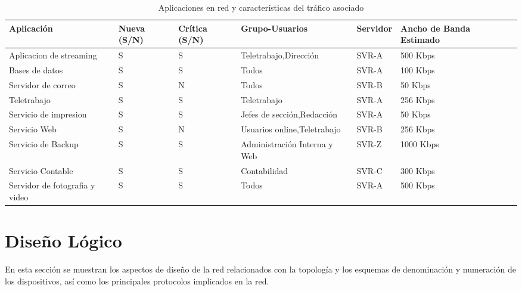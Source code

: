 \documentclass[a4paper,onecolumn,11pt]{article}
\begin{document}
\begin{table}[htbp]
\small \sffamily
\caption{Aplicaciones en red y características del tráfico asociado}
\begin{center}
\begin{tabular}{p{}p{}p{}p{}p{}p{}p{}}
\toprule
\textbf{Aplicación} & \textbf{Nueva (S/N)} & \textbf{Crítica (S/N)} & \textbf{Grupo-Usuarios} & \textbf{Servidor} & \textbf{Ancho de Banda Estimado}\\
\toprule

Aplicacion de streaming & S & S & Teletrabajo,Dirección & SVR-A  & 500 Kbps \\ \midrule
Bases de datos & S & S & Todos & SVR-A  & 100 Kbps \\ \midrule
Servidor de correo & S & N & Todos & SVR-B  &  50 Kbps \\\midrule
Teletrabajo & S & S & Teletrabajo & SVR-A  &  256 Kbps \\\midrule
Servicio de impresion & S & S & Jefes de sección,Redacción & SVR-A  &  50 Kbps \\\midrule
Servicio Web & S & N & Usuarios online,Teletrabajo & SVR-B  &  256 Kbps \\\midrule
Servicio de Backup & S & S & Administración Interna y Web & SVR-Z  &  1000 Kbps \\\midrule
Servicio Contable & S & S & Contabilidad & SVR-C  &  300 Kbps \\\midrule
Servidor de fotografia y video & S & S & Todos & SVR-A  & 500 Kbps \\ 
\bottomrule

\end{tabular}
\end{center}
\label{tab:aplicacionesRed}
\end{table}


\section{Diseño Lógico}

En esta sección se muestran los aspectos de diseño de la red relacionados
con la topología y los esquemas de denominación y numeración de los
dispositivos, así como los principales protocolos implicados en la red.
\end{document}
